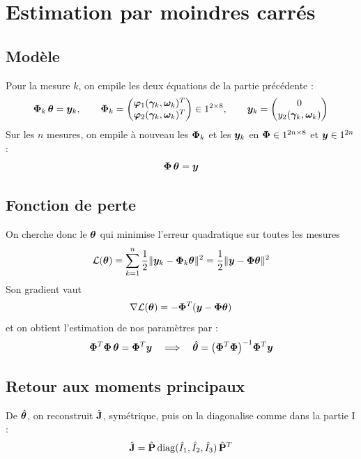 
\section{Estimation par moindres carrés}

\subsection{Modèle}

Pour la mesure $k$, on empile les deux équations de la partie
précédente :
\[
    \mathbf{\Phi}_k\,\bm{\theta} = \bm{y}_k,
    \qquad
    \mathbf{\Phi}_k = \begin{pmatrix}
        \bm{\varphi}_1(\bm{\gamma}_k, \bm{\omega}_k)^T\\
        \bm{\varphi}_2(\bm{\gamma}_k, \bm{\omega}_k)^T
    \end{pmatrix} \in 1^{2\times 8},
    \qquad
    \bm{y}_k = \begin{pmatrix} 0\\ y_2(\bm{\gamma}_k, \bm{\omega}_k)\end{pmatrix}
\]
Sur les $n$ mesures, on empile à nouveau les $\mathbf{\Phi}_k$ et les
$\bm{y}_k$ en $\mathbf{\Phi} \in 1^{2n\times 8}$ et
$\bm{y} \in 1^{2n}$ :
\[
    \mathbf{\Phi}\,\bm{\theta} = \bm{y}
\]

\subsection{Fonction de perte}

On cherche donc le $\bm{\theta}$ qui minimise l'erreur quadratique
sur toutes les mesures
\[
    \mathcal{L}(\bm{\theta})
    = \sum_{k=1}^{n}\frac12\|\bm{y}_k - \mathbf{\Phi}_k\bm{\theta}\|^2
    = \frac12\|\bm{y} - \mathbf{\Phi}\bm{\theta}\|^2
\]
Son gradient vaut
\[
    \nabla\mathcal{L}(\bm{\theta})
    = -\mathbf{\Phi}^T(\bm{y} - \mathbf{\Phi}\bm{\theta})
\]
et on obtient l'estimation de nos paramètres par : 
\[
    \mathbf{\Phi}^T\mathbf{\Phi}\,\bm{\theta} = \mathbf{\Phi}^T\bm{y}
    \quad\Longrightarrow\quad
    \hat{\bm{\theta}} = \bigl(\mathbf{\Phi}^T\mathbf{\Phi}\bigr)^{-1}\mathbf{\Phi}^T\bm{y}
\]

\subsection{Retour aux moments principaux}

De $\hat{\bm{\theta}}$, on reconstruit $\hat{\mathbf{J}}$, symétrique,
puis on la diagonalise comme dans la partie I :
\[
    \hat{\mathbf{J}} = \hat{\mathbf{P}}\,\mathrm{diag}(\hat{I}_1, \hat{I}_2, \hat{I}_3)\,\hat{\mathbf{P}}^T
\]
